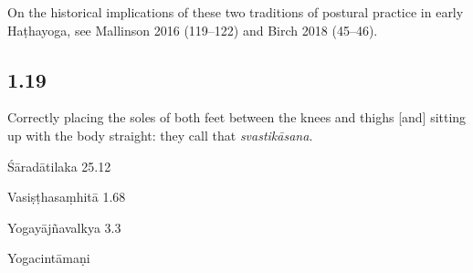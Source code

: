 \begin{ekdosis}
\begin{testimonia}[hp01_018]
\end{testimonia}

\begin{philcomm}[hp01_018]        
On the historical implications of these two traditions of postural practice in early Haṭhayoga, see Mallinson 2016 (119–122) and Birch 2018 (45–46).
\end{philcomm}

\subsection*{1.19}
\begin{translation}[hp01_019]
Correctly placing the soles of both feet between the knees and thighs [and] sitting up with the body straight: they call that \emph{svastikāsana}.
\end{translation}

\begin{sources}[hp01_019]
Śāradātilaka 25.12

\begin{versinnote}
\end{versinnote}

Vasiṣṭhasaṃhitā 1.68

\begin{versinnote}
\end{versinnote}

Yogayājñavalkya 3.3

\begin{versinnote}
\end{versinnote}

\end{sources}

\begin{testimonia}[hp01_019]
Yogacintāmaṇi

\begin{versinnote}
\end{versinnote}


\end{testimonia}
\end{ekdosis}
